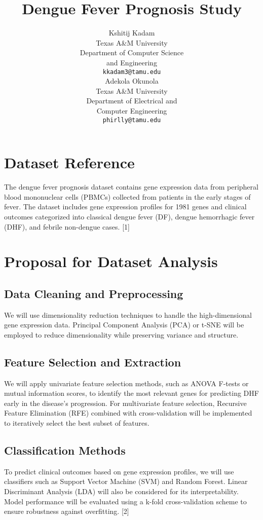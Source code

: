 \documentclass[final]{article}
\title{Dengue Fever Prognosis Study}
\author{
    Kshitij Kadam \\
    Texas A\&M University \\
    Department of Computer Science \\
    and Engineering \\
    \texttt{kkadam3@tamu.edu} \\
    \And
    Adekola Okunola \\
    Texas A\&M University \\
    Department of Electrical and \\
    Computer Engineering \\
    \texttt{phirlly@tamu.edu} \\
}
\begin{document}
\maketitle

\section*{Dataset Reference}
The dengue fever prognosis dataset contains gene expression data from peripheral blood mononuclear cells (PBMCs) collected from patients in the early stages of fever. The dataset includes gene expression profiles for 1981 genes and clinical outcomes categorized into classical dengue fever (DF), dengue hemorrhagic fever (DHF), and febrile non-dengue cases. [1]

\section*{Proposal for Dataset Analysis}

\subsection*{Data Cleaning and Preprocessing}
We will use dimensionality reduction techniques to handle the high-dimensional gene expression data. Principal Component Analysis (PCA) or t-SNE will be employed to reduce dimensionality while preserving variance and structure.

\subsection*{Feature Selection and Extraction}
We will apply univariate feature selection methods, such as ANOVA F-tests or mutual information scores, to identify the most relevant genes for predicting DHF early in the disease's progression. For multivariate feature selection, Recursive Feature Elimination (RFE) combined with cross-validation will be implemented to iteratively select the best subset of features.

\subsection*{Classification Methods}
To predict clinical outcomes based on gene expression profiles, we will use classifiers such as Support Vector Machine (SVM) and Random Forest. Linear Discriminant Analysis (LDA) will also be considered for its interpretability. Model performance will be evaluated using a k-fold cross-validation scheme to ensure robustness against overfitting. [2]
\end{document}
